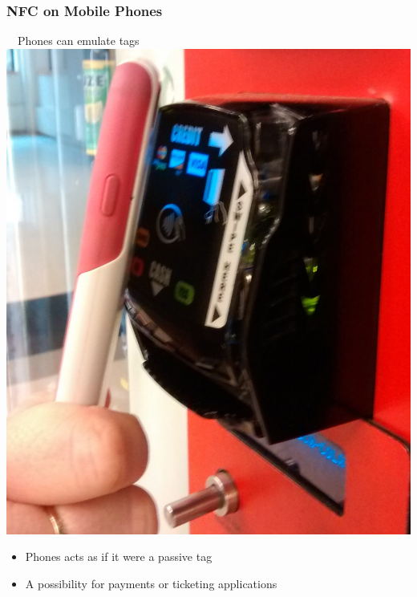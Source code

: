 \documentclass[unknownkeysallowed]{beamer}
\begin{document}
\begin{frame}
\frametitle{NFC on Mobile Phones}
  \begin{center}
  \begin{minipage}{.7\textwidth}
  \begin{block}{~~Phones can emulate tags}\centering
      \includegraphics[width=\linewidth,height=0.2\textheight,keepaspectratio]{figures/ApplePay.jpg}
      \begin{itemize}
  		  \item{Phones acts as if it were a passive tag}
        \pause
  		  \item{A possibility for payments or ticketing applications}
     	\end{itemize}
  \end{block}
  \end{minipage}
  \end{center}
\end{frame}
\end{document}
